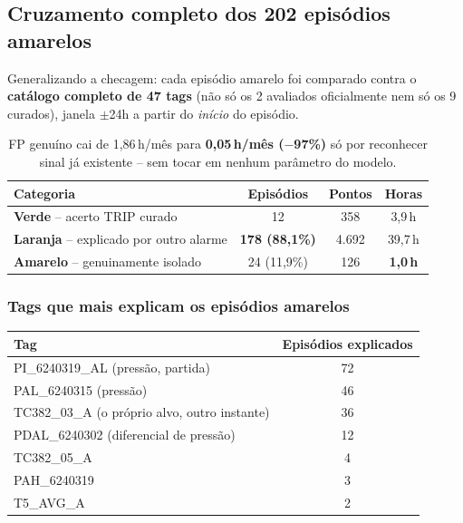 \documentclass[11pt,a4paper]{article}
\begin{document}
\subsection{Cruzamento completo dos 202 episódios amarelos}

Generalizando a checagem: cada episódio amarelo foi comparado contra o
\textbf{catálogo completo de 47 tags} (não só os 2 avaliados oficialmente
nem só os 9 curados), janela $\pm$24h a partir do \emph{início} do
episódio.

\begin{table}[H]
\centering
\begin{tabular}{lccc}
\toprule
\textbf{Categoria} & \textbf{Episódios} & \textbf{Pontos} & \textbf{Horas} \\
\midrule
\textcolor{corVerde}{\textbf{Verde}} -- acerto TRIP curado & 12 & 358 & 3,9\,h \\
\textcolor{corLaranja}{\textbf{Laranja}} -- explicado por outro alarme & \textbf{178 (88,1\%)} & 4.692 & 39,7\,h \\
\textcolor{corAmarelo}{\textbf{Amarelo}} -- genuinamente isolado & 24 (11,9\%) & 126 & \textbf{1,0\,h} \\
\bottomrule
\end{tabular}
\caption{FP genuíno cai de 1,86\,h/mês para \textbf{0,05\,h/mês
($-$97\%)} só por reconhecer sinal já existente -- sem tocar em
nenhum parâmetro do modelo.}
\end{table}

\subsubsection{Tags que mais explicam os episódios amarelos}

\begin{table}[H]
\centering
\begin{tabular}{lc}
\toprule
\textbf{Tag} & \textbf{Episódios explicados} \\
\midrule
PI\_6240319\_AL (pressão, partida) & 72 \\
PAL\_6240315 (pressão) & 46 \\
TC382\_03\_A (o próprio alvo, outro instante) & 36 \\
PDAL\_6240302 (diferencial de pressão) & 12 \\
TC382\_05\_A & 4 \\
PAH\_6240319 & 3 \\
T5\_AVG\_A & 2 \\
\bottomrule
\end{tabular}
\end{table}
\end{document}
